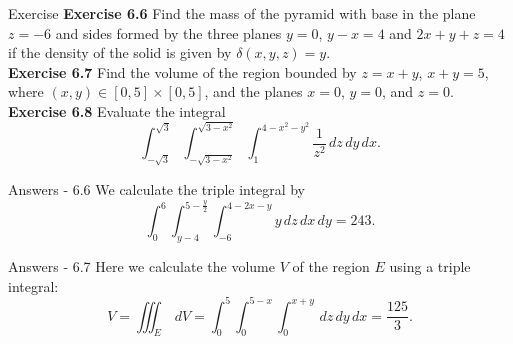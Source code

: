 \documentclass[aspectratio=169, UTF8]{beamer}
\begin{document}


\begin{frame}{Exercise}
    \textbf{Exercise 6.6} Find the mass of the pyramid with base in the plane $z = -6$ and sides
    formed by the three planes $y = 0$, $y - x = 4$ and $2x + y + z = 4$
    if the density of the solid is given by $\delta(x, y, z) = y$. \\
    \textbf{Exercise 6.7} Find the volume of the region bounded by $z = x + y$, $x + y = 5$,
    where $(x, y) \in [0, 5] \times [0, 5]$, and the planes $x = 0$, $y = 0$, and $z = 0$. \\

    \textbf{Exercise 6.8} Evaluate the integral
    \[
        \int_{-\sqrt{3}}^{\sqrt{3}} \int_{-\sqrt{3-x^2}}^{\sqrt{3-x^2}} \int_{1}^{4-x^2-y^2} \frac{1}{z^2} \, dz \, dy \, dx.
    \]
\end{frame}
\begin{frame}{Answers - 6.6}
    We calculate the triple integral by
    \[
        \int_{0}^{6} \int_{y-4}^{5-\frac{y}{2}} \int_{-6}^{4-2x-y} y \, dz \, dx \, dy = 243.
    \]
\end{frame}
\begin{frame}{Answers - 6.7}
    Here we calculate the volume $V$ of the region $E$ using a triple integral:
    \[
        V = \iiint_E \, dV = \int_0^5 \int_0^{5-x} \int_0^{x+y} \, dz \, dy \, dx = \frac{125}{3}.
    \]

\end{frame}
\end{document}
